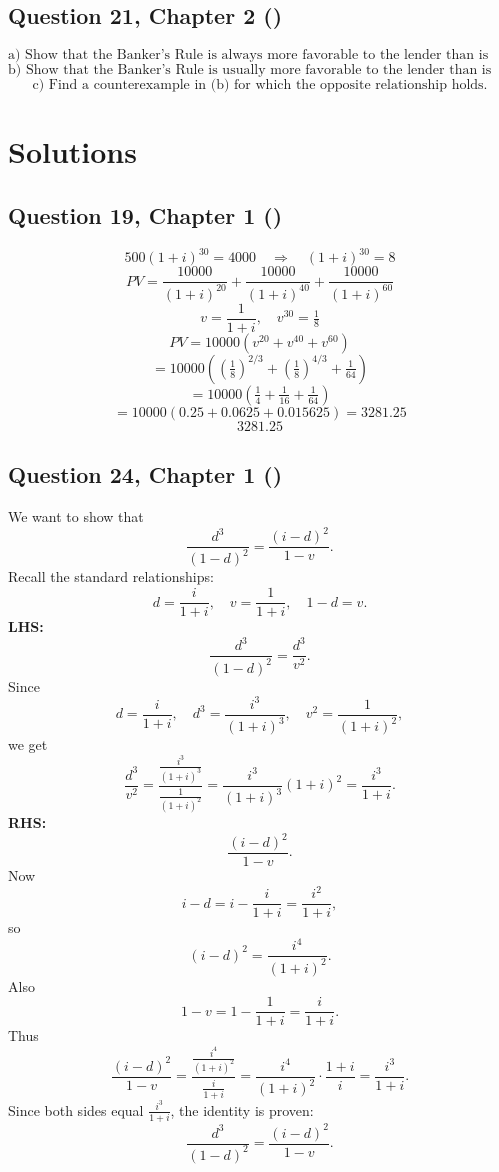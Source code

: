 \documentclass[12pt, a4paper]{article}
\begin{document}
    \bigskip


\subsection*{Question 21, Chapter 2 (\cite{toi3rd})}
\[
\text{a) Show that the Banker’s Rule is always more favorable to the lender than is exact simple interest.}
\]
\[
\text{b) Show that the Banker’s Rule is usually more favorable to the lender than is ordinary simple interest.}
\]
\[
\text{c) Find a counterexample in (b) for which the opposite relationship holds.}
\]

\newpage

\section*{Solutions}

\subsection*{Question 19, Chapter 1  (\cite{toi3rd})}

\[
500(1+i)^{30} = 4000 \quad \Rightarrow \quad (1+i)^{30} = 8
\]
\[
PV = \frac{10000}{(1+i)^{20}} + \frac{10000}{(1+i)^{40}} + \frac{10000}{(1+i)^{60}}
\]
\[
v = \frac{1}{1+i}, \quad v^{30} = \tfrac{1}{8}
\]
\[
PV = 10000\left(v^{20} + v^{40} + v^{60}\right)
\]
\[
= 10000\left(\left(\tfrac{1}{8}\right)^{2/3} + \left(\tfrac{1}{8}\right)^{4/3} + \tfrac{1}{64}\right)
\]
\[
= 10000\left(\tfrac{1}{4} + \tfrac{1}{16} + \tfrac{1}{64}\right)
\]
\[
= 10000\left(0.25 + 0.0625 + 0.015625\right) = 3281.25
\]
\[
\boxed{3281.25}
\]

\subsection*{Question 24, Chapter 1  (\cite{toi3rd})}

We want to show that
\[
\frac{d^3}{(1-d)^2} = \frac{(i-d)^2}{1-v}.
\]
Recall the standard relationships:
\[
d = \frac{i}{1+i}, \quad v = \frac{1}{1+i}, \quad 1-d = v.
\]
\textbf{LHS:}
\[
\frac{d^3}{(1-d)^2} = \frac{d^3}{v^2}.
\]
Since
\[
d = \frac{i}{1+i}, \quad d^3 = \frac{i^3}{(1+i)^3}, \quad v^2 = \frac{1}{(1+i)^2},
\]
we get
\[
\frac{d^3}{v^2} = \frac{\tfrac{i^3}{(1+i)^3}}{\tfrac{1}{(1+i)^2}}
= \frac{i^3}{(1+i)^3}(1+i)^2 = \frac{i^3}{1+i}.
\]
\textbf{RHS:}
\[
\frac{(i-d)^2}{1-v}.
\]
Now
\[
i-d = i - \frac{i}{1+i} = \frac{i^2}{1+i},
\]
so
\[
(i-d)^2 = \frac{i^4}{(1+i)^2}.
\]
Also
\[
1-v = 1 - \frac{1}{1+i} = \frac{i}{1+i}.
\]
Thus
\[
\frac{(i-d)^2}{1-v} = \frac{\tfrac{i^4}{(1+i)^2}}{\tfrac{i}{1+i}}
= \frac{i^4}{(1+i)^2}\cdot \frac{1+i}{i}
= \frac{i^3}{1+i}.
\]
Since both sides equal \(\tfrac{i^3}{1+i}\), the identity is proven:
\[
\frac{d^3}{(1-d)^2} = \frac{(i-d)^2}{1-v}.
\]
\end{document}
